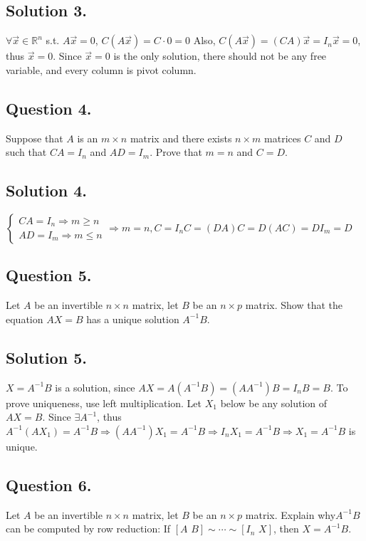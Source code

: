 \documentclass{article}
\begin{document}
\subsection*{Solution 3.}
$\forall\Vec{x}\in\mathbb{R}^n$ s.t. $A\Vec{x}=0$, $C(A\Vec{x})=C\cdot 0=0$\newline
Also, $C(A\Vec{x})=(CA)\Vec{x}=I_n\Vec{x}=0$, thus $\Vec{x}=0$. Since $\Vec{x}=0$ is the only solution, there should not be any free variable, and every column is pivot column.
\subsection*{Question 4.}
Suppose that $A$ is an $m \times n$ matrix and there exists $n \times m$ matrices $C$ and $D$ such that $CA=I_n$ and $AD=I_m$. Prove that $m=n$ and $C=D$.
\subsection*{Solution 4.}
$\left\{\begin{array}{c}CA=I_n\Rightarrow m\geq n\\AD=I_m\Rightarrow m \leq n\end{array} \Rightarrow m=n\right.,C=I_n C=(DA)C=D(AC)=D I_m=D$ 
\subsection*{Question 5.}
Let $A$ be an invertible $n \times n$ matrix, let $B$ be an $n \times p$ matrix. Show that the equation $AX=B$ has a unique solution $A^{-1}B$.
\subsection*{Solution 5.}
$X=A^{-1}B$ is a solution, since $AX=A(A^{-1}B)=(AA^{-1})B=I_nB=B$.
To prove uniqueness, use left multiplication. Let $X_1$ below be any solution of $AX=B$. Since $\exists A^{-1}$, thus $A^{-1}(AX_1)=A^{-1}B\Rightarrow(AA^{-1})X_1=A^{-1}B\Rightarrow I_n X_1=A^{-1}B\Rightarrow X_1=A^{-1}B$ is unique.
\subsection*{Question 6.}
Let $A$ be an invertible $n \times n$ matrix, let $B$ be an $n \times p$ matrix. Explain why$A^{-1}B$ can be computed by row reduction: If $[A\,\, B] \sim \cdots \sim [I_n \,\,X]$, then $X=A^{-1}B$.
\end{document}
